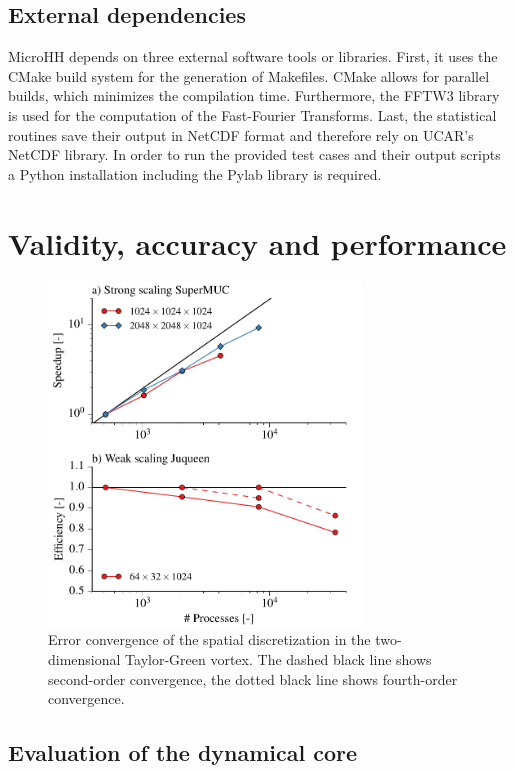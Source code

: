 \documentclass[gmd]{copernicus}
\begin{document}
\subsection{External dependencies}
MicroHH depends on three external software tools or libraries. First, it uses the CMake build system for the generation of Makefiles. CMake allows for parallel builds, which minimizes the compilation time. Furthermore, the FFTW3 library \citep{Frigo2005} is used for the computation of the Fast-Fourier Transforms. Last, the statistical routines save their output in NetCDF format and therefore rely on UCAR's NetCDF library. In order to run the provided test cases and their output scripts a Python installation including the Pylab library is required.

\section{Validity, accuracy and performance} \label{sec:tests}
\begin{figure}[t]
\vspace*{2mm}
\begin{center}
\includegraphics[width=8.3cm]{figs/scaling.pdf}
\end{center}
\caption{Error convergence of the spatial discretization in the two-dimensional Taylor-Green vortex. The dashed black line shows second-order convergence, the dotted black line shows fourth-order convergence.}
\end{figure}
\subsection{Evaluation of the dynamical core}
\end{document}
